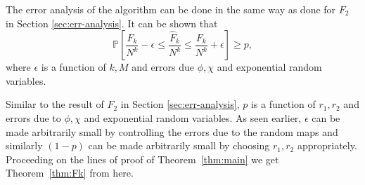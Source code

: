 \documentclass[10pt,twosided,a4paper,draft,onecolumn]{article}
\newcommand{\prob}[1]{\mathbb{P}\left[ #1 \right]}
\begin{document}
The error analysis of the algorithm can be done in the same way as
done for $F_2$ in Section \ref{sec:err-analysis}. It can be shown that
\begin{displaymath}
  \prob{\frac{F_k}{N^k} - \epsilon \leq \frac{\hat{F}_k}{N^k} \leq 
  \frac{F_k}{N^k} + \epsilon} \geq p,
\end{displaymath}
where $\epsilon$ is a function of $k,M$ and errors due $\phi,\chi$ and
exponential random variables.

Similar to the result of $F_2$ in Section \ref{sec:err-analysis}, $p$
is a function of $r_1,r_2$ and errors due to $\phi,\chi$ and
exponential random variables. As seen earlier, $\epsilon$ can be made
arbitrarily small by controlling the errors due to the random maps and
similarly $(1-p)$ can be made arbitrarily small by choosing $r_1,r_2$
appropriately. Proceeding on the lines of proof of Theorem~\ref{thm:main} we get Theorem~\ref{thm:Fk} from here.
\end{document}
